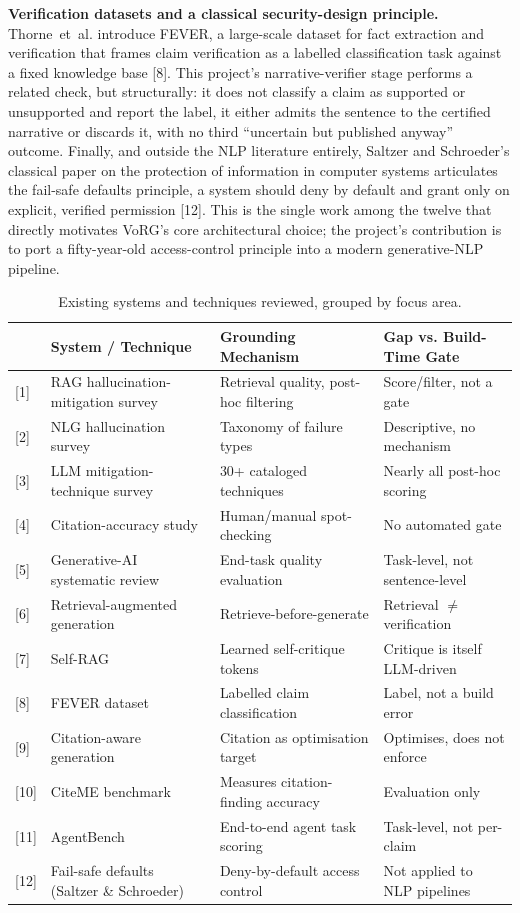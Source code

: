 \documentclass[12pt,a4paper]{report}
\newcommand{\headrow}{\rowcolor{navy}}
\newcommand{\hd}[1]{{\color{white}\bfseries #1}}
\begin{document}
\textbf{Verification datasets and a classical security-design principle.}
Thorne~et~al. introduce FEVER, a large-scale dataset for fact extraction and
verification that frames claim verification as a labelled classification task
against a fixed knowledge base [8]. This project's
narrative-verifier stage performs a related check, but structurally: it does
not classify a claim as supported or unsupported and report the label, it
either admits the sentence to the certified narrative or discards it, with no
third ``uncertain but published anyway'' outcome. Finally, and outside the
NLP literature entirely, Saltzer and Schroeder's classical paper on the
protection of information in computer systems articulates the fail-safe
defaults principle, a system should deny by default and grant only on
explicit, verified permission [12]. This is the single work
among the twelve that directly motivates VoRG's core architectural choice; the
project's contribution is to port a fifty-year-old access-control principle
into a modern generative-NLP pipeline.

\begin{table}[H]
\centering
\caption{Existing systems and techniques reviewed, grouped by focus area.}
\label{tab:litreview}
\begin{tabular}{@{}p{1.0cm}p{5.0cm}p{4.6cm}p{3.0cm}@{}}
\toprule
\headrow \hd{Ref.} & \hd{System / Technique} & \hd{Grounding Mechanism} & \hd{Gap vs. Build-Time Gate} \\
\midrule
{[1]} & RAG hallucination-mitigation survey & Retrieval quality, post-hoc filtering & Score/filter, not a gate \\
{[2]} & NLG hallucination survey & Taxonomy of failure types & Descriptive, no mechanism \\
{[3]} & LLM mitigation-technique survey & 30+ cataloged techniques & Nearly all post-hoc scoring \\
{[4]} & Citation-accuracy study & Human/manual spot-checking & No automated gate \\
{[5]} & Generative-AI systematic review & End-task quality evaluation & Task-level, not sentence-level \\
{[6]} & Retrieval-augmented generation & Retrieve-before-generate & Retrieval $\neq$ verification \\
{[7]} & Self-RAG & Learned self-critique tokens & Critique is itself LLM-driven \\
{[8]} & FEVER dataset & Labelled claim classification & Label, not a build error \\
{[9]} & Citation-aware generation & Citation as optimisation target & Optimises, does not enforce \\
{[10]} & CiteME benchmark & Measures citation-finding accuracy & Evaluation only \\
{[11]} & AgentBench & End-to-end agent task scoring & Task-level, not per-claim \\
{[12]} & Fail-safe defaults (Saltzer \& Schroeder) & Deny-by-default access control & Not applied to NLP pipelines \\
\bottomrule
\end{tabular}
\end{table}
\end{document}
